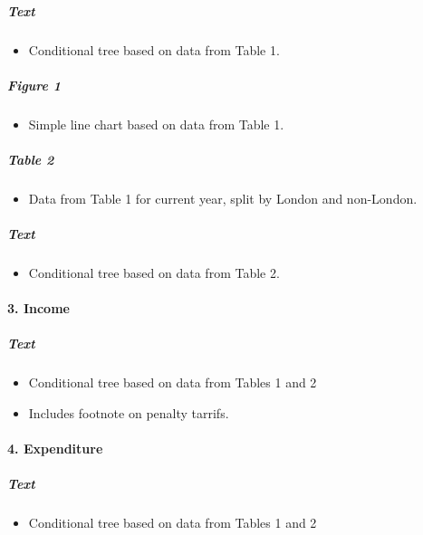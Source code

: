 \documentclass[]{article}
\providecommand{\tightlist}{%
  \setlength{\itemsep}{0pt}\setlength{\parskip}{0pt}}
\let\oldparagraph\paragraph
\renewcommand{\paragraph}[1]{\oldparagraph{#1}\mbox{}}
\let\oldsubparagraph\subparagraph
\renewcommand{\subparagraph}[1]{\oldsubparagraph{#1}\mbox{}}
\begin{document}
\hypertarget{text-9}{%
\subparagraph{Text}\label{text-9}}

\begin{itemize}
\tightlist
\item
  Conditional tree based on data from Table 1.
\end{itemize}

\hypertarget{figure-1}{%
\subparagraph{Figure 1}\label{figure-1}}

\begin{itemize}
\tightlist
\item
  Simple line chart based on data from Table 1.
\end{itemize}

\hypertarget{table-2-1}{%
\subparagraph{Table 2}\label{table-2-1}}

\begin{itemize}
\tightlist
\item
  Data from Table 1 for current year, split by London and non-London.
\end{itemize}

\hypertarget{text-10}{%
\subparagraph{Text}\label{text-10}}

\begin{itemize}
\tightlist
\item
  Conditional tree based on data from Table 2.
\end{itemize}

\hypertarget{income-1}{%
\paragraph{3. Income}\label{income-1}}

\hypertarget{text-11}{%
\subparagraph{Text}\label{text-11}}

\begin{itemize}
\tightlist
\item
  Conditional tree based on data from Tables 1 and 2
\item
  Includes footnote on penalty tarrifs.
\end{itemize}

\hypertarget{expenditure-1}{%
\paragraph{4. Expenditure}\label{expenditure-1}}

\hypertarget{text-12}{%
\subparagraph{Text}\label{text-12}}

\begin{itemize}
\tightlist
\item
  Conditional tree based on data from Tables 1 and 2
\end{itemize}
\end{document}
